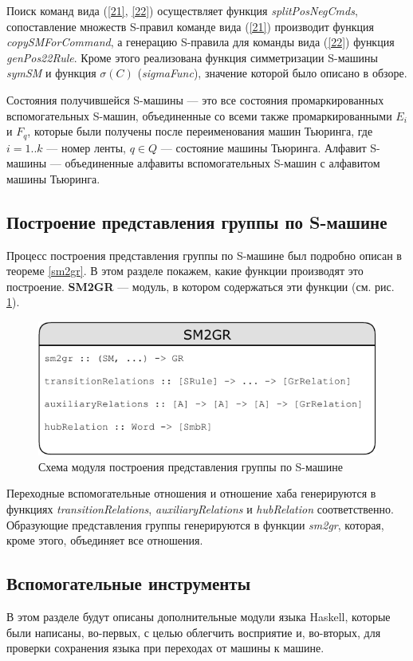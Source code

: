 \documentclass[14pt]{matmex-diploma-custom}
\begin{document}
Поиск команд вида (\ref{21}, \ref{22}) осуществляет функция \textit{splitPosNegCmds}, сопоставление множеств S-правил команде вида (\ref{21}) производит функция \textit{copySMForCommand}, а генерацию S-правила для команды вида (\ref{22}) функция \textit{genPos22Rule}.
Кроме этого реализована функция симметризации S-машины \textit{symSM} и функция $\sigma(C)$ (\textit{sigmaFunc}), значение которой было описано в обзоре.

Состояния получившейся S-машины --- это все состояния промаркированных вспомогательных S-машин, объединенные со всеми также промаркированными $E_i$ и $F_q$, которые были получены после переименования машин Тьюринга, где $i=1..k$ --- номер ленты, $q \in Q$ --- состояние машины Тьюринга.
Алфавит S-машины --- объединенные алфавиты вспомогательных S-машин с алфавитом машины Тьюринга. 

\subsection{Построение представления группы по S-машине}
Процесс построения представления группы по S-машине был подробно описан в теореме \ref{sm2gr}. В этом разделе покажем, какие функции производят это построение. 
\textbf{SM2GR} --- модуль, в котором содержаться эти функции (см. рис. \ref{fig:SM2GR}).

\begin{figure}[H]
\centering
  \includegraphics[width=\linewidth]{pics/SM2GR.pdf}
  \caption{Схема модуля построения представления группы по S-машине}
  \label{fig:SM2GR}
\end{figure}

Переходные вспомогательные отношения и отношение хаба генерируются в функциях \textit{transitionRelations}, \textit{auxiliaryRelations} и \textit{hubRelation} соответственно. Образующие представления группы генерируются в функции \textit{sm2gr}, которая, кроме этого, объединяет все отношения.

\subsection{Вспомогательные инструменты}
В этом разделе будут описаны дополнительные модули языка Haskell, которые были написаны, во-первых, с целью облегчить восприятие и, во-вторых, для проверки сохранения языка при переходах от машины к машине. 
\end{document}

